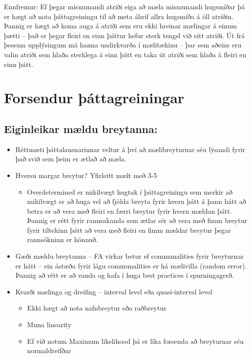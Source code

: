 \documentclass[]{book}
\providecommand{\tightlist}{%
  \setlength{\itemsep}{0pt}\setlength{\parskip}{0pt}}
\begin{document}
Ennfremur: Ef þegar mismunandi atriði eiga að mæla mismunandi hugsmíðar þá er hægt að nota þáttagreiningu til að meta áhrif allra hugsmíða á öll atriðin. Þannig er hægt að koma auga á atriði sem eru ekki hreinar mælingar á einum þætti -- það er þegar fleiri en einn þáttur hefur sterk tengsl við eitt atriði. Út frá þessum upplýsingum má hanna undirkvarða í mælitækinu -- þar sem aðeins eru valin atriði sem hlaða sterklega á einn þátt en taka út atriði sem hlaða á fleiri en einn þátt.

\hypertarget{forsendur-uxfeuxe1ttagreiningar}{%
\section{Forsendur þáttagreiningar}\label{forsendur-uxfeuxe1ttagreiningar}}

\hypertarget{eiginleikar-muxe6ldu-breytanna}{%
\subsection{Eiginleikar mældu breytanna:}\label{eiginleikar-muxe6ldu-breytanna}}

\begin{itemize}
\tightlist
\item
  Réttmæti þáttalausnarinnar veltur á því að mælibreyturnar séu lýsandi fyrir það svið sem þeim er ætlað að mæla.
\item
  Hversu margar breytur? Yfirleitt mælt með 3-5

  \begin{itemize}
  \tightlist
  \item
    Overdetermined er mikilvægt hugtak í þáttagreiningu sem merkir að mikilvægt er að huga vel að
    fjölda breyta fyrir hvern þátt á þann hátt að betra er að vera með fleiri en færri breytur fyrir
    hvern mældan þátt. Þannig er rétt fyrir rannsakanda sem ætlar sér að vera með fimm breytur fyrir
    tiltekinn þátt að vera með fleiri en fimm mældar breytur þegar rannsókninn er hönnuð.
  \end{itemize}
\item
  Gæði mældu breytanna -- FA virkar betur ef communalities fyrir breyturnar er hátt -- ein ástæða fyrir lágu communalities er há mælivilla (random error). Þannig að rétt er að vanda og hafa í huga best practices í spurningagerð.
\item
  Kvarði mælinga og dreifing -- interval level eða quasi-interval level

  \begin{itemize}
  \tightlist
  \item
    Ekki hægt að nota nafnbreytur eða raðbreytur
  \item
    Muna linearity
  \item
    Ef við notum Maximum likelihood þá er líka forsenda að breyturnar séu normaldreifðar
  \end{itemize}
\end{itemize}
\end{document}
